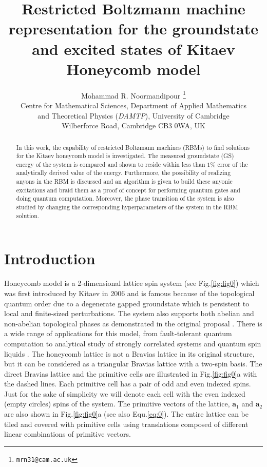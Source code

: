 \documentclass{article}
\title{Restricted Boltzmann machine representation for the groundstate and excited states of Kitaev Honeycomb model}
\author{
    Mohammad R. Noormandipour \thanks{\texttt{mrn31@cam.ac.uk}} \\
    Centre for Mathematical Sciences, Department of Applied Mathematics \\ 
    and Theoretical Physics (\textit{DAMTP}), University of Cambridge \\
    Wilberforce Road, Cambridge CB3 0WA, UK \\
}
\begin{document}
\maketitle

\begin{abstract}
In this work, the capability of restricted Boltzmann machines (RBMs) to find solutions for the Kitaev honeycomb model is investigated. The measured groundstate (GS) energy of the system is compared and shown to reside within less than $1\%$ error of the analytically derived value of the energy. Furthermore, the possibility of realizing anyons in the RBM is discussed and an algorithm is given to build these anyonic excitations and braid them as a proof of concept for performing quantum gates and doing quantum computation. Moreover, the phase transition of the system is also studied by changing the corresponding hyperparameters of the system in the RBM solution.
\end{abstract}




\section{Introduction}
Honeycomb model is a 2-dimensional lattice spin system (see Fig.\hspace{0.2mm}\ref{fig:fig0}) which was first introduced by Kitaev in 2006 \cite{kita} and is famous because of the topological quantum order due to a degenerate gapped groundstate which is persistent to local and finite-sized perturbations. The system also supports both abelian and non-abelian topological phases as demonstrated in the original proposal \cite{kita}. There is a wide range of applications for this model, from fault-tolerant quantum computation \cite{kita2} to analytical study of strongly correlated systems \cite{str-cor} and quantum spin liquids \cite{spi-liq}. The honeycomb lattice is not a Bravias lattice in its original structure, but it can be considered as a triangular Bravias lattice with a two-spin basis. The direct Bravias lattice and the primitive cells are illustrated in Fig.\hspace{0.2mm}\ref{fig:fig0}a with the dashed lines. Each primitive cell has a pair of odd and even indexed spins. Just for the sake of simplicity we will denote each cell with the even indexed (empty circles) spins of the system. The primitive vectors of the lattice, $\textbf{a}_1$ and $\textbf{a}_2$ are also shown in Fig.\hspace{0.2mm}\ref{fig:fig0}a (see also Equ.\hspace{0.2mm}\ref{eq:0}). The entire lattice can be tiled and covered with primitive cells using translations composed of different linear combinations of primitive vectors. 
\end{document}
